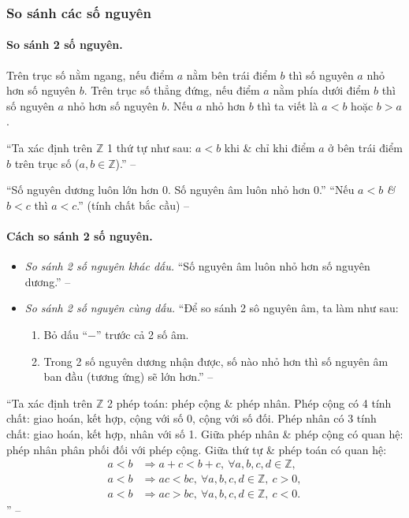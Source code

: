 \documentclass{article}
\numberwithin{equation}{section}
\begin{document}
\subsubsection{So sánh các số nguyên}

\paragraph{So sánh 2 số nguyên.}
\begin{tcolorbox}
	Trên trục số nằm ngang, nếu điểm $a$ nằm bên trái điểm $b$ thì số nguyên $a$ nhỏ hơn số nguyên $b$. Trên trục số thẳng đứng, nếu điểm $a$ nằm phía dưới điểm $b$ thì số nguyên $a$ nhỏ hơn số nguyên $b$. Nếu $a$ nhỏ hơn $b$ thì ta viết là $a < b$ hoặc $b > a$.
\end{tcolorbox}
``Ta xác định trên $\mathbb{Z}$ 1 thứ tự như sau: $a < b$ khi \& chỉ khi điểm $a$ ở bên trái điểm $b$ trên trục số ($a,b\in\mathbb{Z}$).'' -- \cite[Chương 2, p. 32]{Binh_Toan_6_tap_1}

``Số nguyên dương luôn lớn hơn 0. Số nguyên âm luôn nhỏ hơn 0.'' ``Nếu $a < b$ \textit{\&} $b < c$ thì $a < c$.'' (tính chất bắc cầu) -- \cite[p. 67]{SGK_Toan_6_Canh_Dieu_tap_1}

\paragraph{Cách so sánh 2 số nguyên.}
\begin{itemize}
	\item \textit{So sánh 2 số nguyên khác dấu.} ``Số nguyên âm luôn nhỏ hơn số nguyên dương.'' -- \cite[p. 68]{SGK_Toan_6_Canh_Dieu_tap_1}
	\item \textit{So sánh 2 số nguyên cùng dấu.} ``Để so sánh 2 sô nguyên âm, ta làm như sau:
	\begin{enumerate}
		\item Bỏ dấu ``$-$'' trước cả 2 số âm.
		\item Trong 2 số nguyên dương nhận được, số nào nhỏ hơn thì số nguyên âm ban đầu (tương ứng) sẽ lớn hơn.'' -- \cite[p. 69]{SGK_Toan_6_Canh_Dieu_tap_1}
	\end{enumerate}
\end{itemize}


``Ta xác định trên $\mathbb{Z}$ 2 phép toán: phép cộng \& phép nhân. Phép cộng có 4 tính chất: giao hoán, kết hợp, cộng với số 0, cộng với số đối. Phép nhân có 3 tính chất: giao hoán, kết hợp, nhân với số 1. Giữa phép nhân \& phép cộng có quan hệ: phép nhân phân phối đối với phép cộng. Giữa thứ tự \& phép toán có quan hệ:
\begin{align*}
	a < b&\Rightarrow a + c < b + c,\ \forall a,b,c,d\in\mathbb{Z},\\
	a < b&\Rightarrow ac < bc,\ \forall a,b,c,d\in\mathbb{Z},\ c > 0,\\
	a < b&\Rightarrow ac > bc,\ \forall a,b,c,d\in\mathbb{Z},\ c < 0.
\end{align*}
'' -- \cite[p. 32]{Binh_Toan_6_tap_1}
\end{document}
